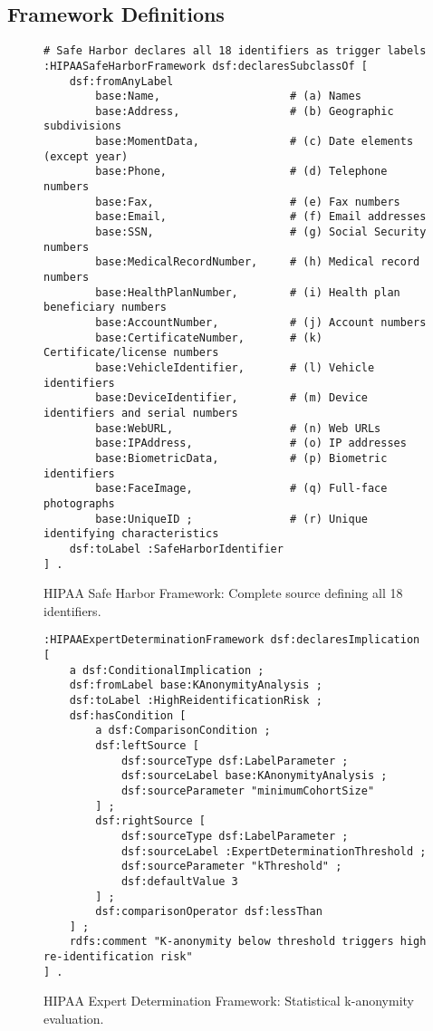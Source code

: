 \documentclass{IOS-Book-Article}
\begin{document}
\subsection{Framework Definitions}\label{sec:appendix-frameworks}

\begin{figure}[ht]
\begin{lstlisting}[basicstyle=\ttfamily, frame=none]
# Safe Harbor declares all 18 identifiers as trigger labels
:HIPAASafeHarborFramework dsf:declaresSubclassOf [
    dsf:fromAnyLabel
        base:Name,                    # (a) Names
        base:Address,                 # (b) Geographic subdivisions
        base:MomentData,              # (c) Date elements (except year)
        base:Phone,                   # (d) Telephone numbers
        base:Fax,                     # (e) Fax numbers
        base:Email,                   # (f) Email addresses
        base:SSN,                     # (g) Social Security numbers
        base:MedicalRecordNumber,     # (h) Medical record numbers
        base:HealthPlanNumber,        # (i) Health plan beneficiary numbers
        base:AccountNumber,           # (j) Account numbers
        base:CertificateNumber,       # (k) Certificate/license numbers
        base:VehicleIdentifier,       # (l) Vehicle identifiers
        base:DeviceIdentifier,        # (m) Device identifiers and serial numbers
        base:WebURL,                  # (n) Web URLs
        base:IPAddress,               # (o) IP addresses
        base:BiometricData,           # (p) Biometric identifiers
        base:FaceImage,               # (q) Full-face photographs
        base:UniqueID ;               # (r) Unique identifying characteristics
    dsf:toLabel :SafeHarborIdentifier
] .
\end{lstlisting}
\caption{HIPAA Safe Harbor Framework: Complete source defining all 18 identifiers.}
\label{fig:appendix-safe-harbor}
\end{figure}

\begin{figure}[ht]
\begin{lstlisting}[basicstyle=\ttfamily, frame=none]
:HIPAAExpertDeterminationFramework dsf:declaresImplication [
    a dsf:ConditionalImplication ;
    dsf:fromLabel base:KAnonymityAnalysis ;
    dsf:toLabel :HighReidentificationRisk ;
    dsf:hasCondition [
        a dsf:ComparisonCondition ;
        dsf:leftSource [
            dsf:sourceType dsf:LabelParameter ;
            dsf:sourceLabel base:KAnonymityAnalysis ;
            dsf:sourceParameter "minimumCohortSize"
        ] ;
        dsf:rightSource [
            dsf:sourceType dsf:LabelParameter ;
            dsf:sourceLabel :ExpertDeterminationThreshold ;
            dsf:sourceParameter "kThreshold" ;
            dsf:defaultValue 3
        ] ;
        dsf:comparisonOperator dsf:lessThan
    ] ;
    rdfs:comment "K-anonymity below threshold triggers high re-identification risk"
] .
\end{lstlisting}
\caption{HIPAA Expert Determination Framework: Statistical k-anonymity evaluation.}
\label{fig:appendix-expert-determination}
\end{figure}
\end{document}
